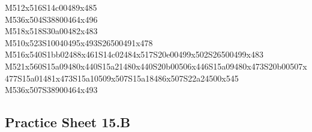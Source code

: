 \documentclass{article}
\begin{document}
\begin{multicols}{5}
\begin{center}
M512x516S14c00489x485 %
\\M536x504S38800464x496 %
\\M518x518S30a00482x483 %
\\M510x523S10040495x493S26500491x478 %
\\M516x540S1bb02488x461S14c02484x517S20e00499x502S26500499x483 %
\\M521x560S15a09480x440S15a21480x440S20b00506x446S15a09480x473S20b00507x477S15a01481x473S15a10509x507S15a18486x507S22a24500x545 %
\\M536x507S38900464x493 %
\vfil

\end{center}
\end{multicols}

\subsection{Practice Sheet 15.B}
\end{document}
